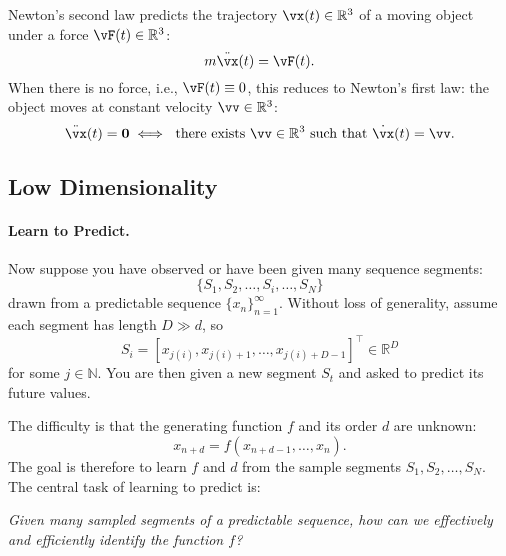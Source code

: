 \documentclass[../../book-main.tex]{subfiles}
\begin{document}
\begin{example}
Newton's second law predicts the trajectory $\vx(t) \in \R^{3}$ of a moving object under a force $\vF(t) \in \R^{3}$:
\begin{equation}
    m\ddot{\vx}(t) = \vF(t).
\end{equation}
When there is no force, i.e., $\vF(t) \equiv 0$, this reduces to Newton's first law: the object moves at constant velocity $\vv \in \R^{3}$:
\begin{equation}
    \ddot{\vx}(t) = \vzero \iff \ \text{there exists $\vv \in \R^{3}$ such that $\dot{\vx}(t) = \vv$}.
\end{equation}
\end{example}


\subsection{Low Dimensionality}\label{sec:intro-low-dimensionality}
\paragraph{Learn to Predict.}
Now suppose you have observed or have been given many sequence segments:
\begin{equation}
    \{S_1, S_2, \ldots, S_i, \ldots, S_N\}
\end{equation}
drawn from a predictable sequence $\{x_n\}_{n=1}^\infty$. Without loss of generality, assume each segment has length $D \gg d$, so
\begin{equation}
    S_i = [x_{j(i)}, x_{j(i)+1}, \ldots, x_{j(i)+D-1}]^\top \in \mathbb{R}^D
\end{equation}
for some $j \in \mathbb{N}$. You are then given a new segment $S_t$ and asked to predict its future values.

The difficulty is that the generating function $f$ and its order $d$ are unknown:
\begin{equation}
    x_{n+d} = f(x_{n+d-1}, \ldots, x_{n}).
\label{eqn:sequence-order-d}
\end{equation}
The goal is therefore to learn $f$ and $d$ from the sample segments $S_1, S_2, \ldots, S_N$. The central task of learning to predict is:
\begin{center}
\textit{Given many sampled segments of a predictable sequence, how can we effectively and efficiently identify the function $f$?}
\end{center}
\end{document}
